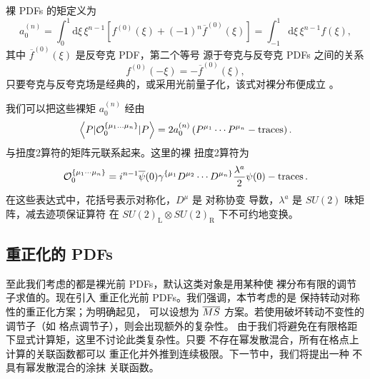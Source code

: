 裸 PDFs 的矩定义为
\begin{equation}
a_{0}^{(n)} = \int_0^1
\mathrm{d}\xi\,\xi^{n-1}\left[
f^{(0)}(\xi)+(-1)^n\overline{f}^{(0)}(\xi)\right] = \int_{-1}^1
\mathrm{d}\xi\,\xi^{n-1}
f(\xi),
\end{equation}
其中 $\overline{f}^{(0)}(\xi)$ 是反夸克 PDF，第二个等号
源于夸克与反夸克 PDFs 之间的关系
\begin{equation}\label{eq:pdf2apdf}
f^{(0)}(-\xi) = -\overline{f}^{(0)}(\xi),
\end{equation}
只要夸克与反夸克场是经典的，或采用光前量子化，该式对裸分布便成立 \cite{Collins:1981uw}。

我们可以把这些裸矩 $a_{0}^{(n)}$ 经由
\begin{equation}\label{eq:opePDF}
\left\langle P | {\cal O}_{0}^{\{\mu_1\ldots \mu_n\}} | P
\right\rangle = 2a_{0}^{(n)} \left(P^{\mu_1}\cdots P^{\mu_n} -
\mathrm{traces}\right).
\end{equation}
与扭度2算符的矩阵元联系起来。这里的裸
扭度2算符为
\begin{equation}\label{eq:baretwist2def}
{\cal
O}_0^{\{\mu_1\cdots \mu_n\}} = i^{n-1}\overline{\psi}(0)
\gamma^{\{\mu_1}D^{\mu_2}\cdots
D^{\mu_n\}}\frac{\lambda^a}{2}\psi(0)-\operatorname{traces}.
\end{equation}
在这些表达式中，花括号表示对称化，$D^\mu$ 是
对称协变
导数，$\lambda^a$ 是 $SU(2)$ 味矩阵，减去迹项保证算符
在 $SU(2)_{\mathrm{L}}\otimes SU(2)_{\mathrm{R}}$ 下不可约地变换。

\subsection{重正化的 PDFs}

至此我们考虑的都是裸光前 PDFs，默认这类对象是用某种使
裸分布有限的调节子求值的。现在引入
重正化光前 PDFs。我们强调，本节考虑的是
保持转动对称性的重正化方案；为明确起见，
可以设想为 $\overline{MS}$ 方案。若使用破坏转动不变性的调节子（如
格点调节子），则会出现额外的复杂性。
由于我们将避免在有限格距下显式计算矩，这里不讨论此类复杂性。只要
不存在幂发散混合，所有在格点上计算的关联函数都可以
重正化并外推到连续极限。下一节中，我们将提出一种
不具有幂发散混合的涂抹
关联函数。

